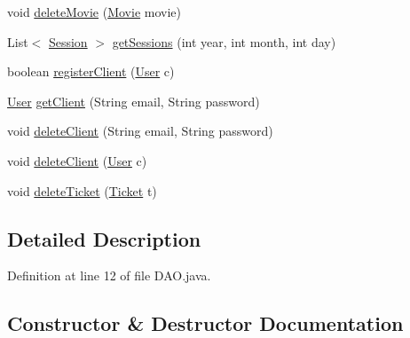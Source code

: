 \begin{DoxyCompactItemize}
void \mbox{\hyperlink{classes_1_1deusto_1_1server_1_1jdo_1_1_d_a_o_a479ca9a8597aada4e74445699140e0fd}{delete\+Movie}} (\mbox{\hyperlink{classes_1_1deusto_1_1server_1_1jdo_1_1_movie}{Movie}} movie)
\item 
List$<$ \mbox{\hyperlink{classes_1_1deusto_1_1server_1_1jdo_1_1_session}{Session}} $>$ \mbox{\hyperlink{classes_1_1deusto_1_1server_1_1jdo_1_1_d_a_o_a2f9f9eb5adc37f559d7fefe2da6544f1}{get\+Sessions}} (int year, int month, int day)
\item 
boolean \mbox{\hyperlink{classes_1_1deusto_1_1server_1_1jdo_1_1_d_a_o_a783758c37658336ee1e4e995a672a0ce}{register\+Client}} (\mbox{\hyperlink{classes_1_1deusto_1_1server_1_1jdo_1_1_user}{User}} c)
\item 
\mbox{\hyperlink{classes_1_1deusto_1_1server_1_1jdo_1_1_user}{User}} \mbox{\hyperlink{classes_1_1deusto_1_1server_1_1jdo_1_1_d_a_o_a340f51843de8957e9ef8b0c95081512a}{get\+Client}} (String email, String password)
\item 
void \mbox{\hyperlink{classes_1_1deusto_1_1server_1_1jdo_1_1_d_a_o_a9664ce68819a53c7b27add7f305a52b0}{delete\+Client}} (String email, String password)
\item 
void \mbox{\hyperlink{classes_1_1deusto_1_1server_1_1jdo_1_1_d_a_o_aa914bb9b49e39cfa9a1254ce578aaae1}{delete\+Client}} (\mbox{\hyperlink{classes_1_1deusto_1_1server_1_1jdo_1_1_user}{User}} c)
\item 
void \mbox{\hyperlink{classes_1_1deusto_1_1server_1_1jdo_1_1_d_a_o_a174a90986e95dcae4ab728c8d1a16ca8}{delete\+Ticket}} (\mbox{\hyperlink{classes_1_1deusto_1_1server_1_1jdo_1_1_ticket}{Ticket}} t)
\end{DoxyCompactItemize}


\subsection{Detailed Description}


Definition at line 12 of file D\+A\+O.\+java.



\subsection{Constructor \& Destructor Documentation}
\mbox{\label{classes_1_1deusto_1_1server_1_1jdo_1_1_d_a_o_a6b7d3b6555e4f370d347919a33620607}} 

